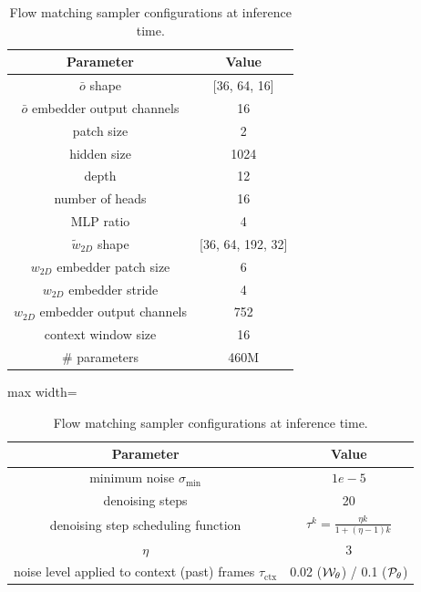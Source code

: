\begin{subappendices}
\begin{table}[htbp]
\begin{minipage}[t]{0.48\textwidth}
\vspace{0.8em}

\caption{Pixel denoiser configuration.}
\label{c4:table:pixel-denoiser}
\begin{tabular}{cc}\toprule
Parameter & Value \\
\midrule
$\bar{o}$ shape & [36, 64, 16] \\
$\bar{o}$ embedder output channels & 16 \\
patch size & 2 \\
hidden size & 1024 \\
depth & 12 \\
number of heads & 16 \\
MLP ratio & 4 \\
$\tilde{w}_{2D}$ shape & [36, 64, 192, 32] \\
${w}_{2D}$ embedder patch size & 6 \\
${w}_{2D}$ embedder stride & 4 \\
${w}_{2D}$ embedder output channels & 752 \\
context window size & 16 \\
\# parameters & 460M \\
\bottomrule
\end{tabular}

\vspace{0.8em}

\caption{Flow matching sampler configurations at inference time.}
\label{c4:table:samplers}
\begin{adjustbox}{max width=\linewidth}
\begin{tabular}{cc}\toprule
Parameter & Value \\
\midrule
minimum noise $\sigma_\text{min}$ & $1e-5$ \\
denoising steps & 20 \\
denoising step scheduling function & $\tau^k = \frac{\eta k}{1 + (\eta-1)k}$ \\
$\eta$ & 3 \\
noise level applied to context (past) frames $\tau_\text{ctx}$ & 0.02 (${\mathcal{W}}_\theta$) / 0.1 (${\mathcal{P}}_\theta$) \\
\bottomrule
\end{tabular}
\end{adjustbox}

\end{minipage}

\end{table}





\end{subappendices}
